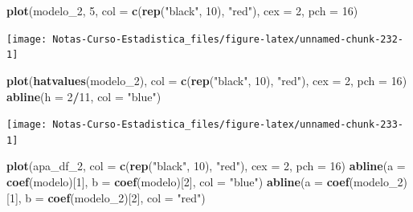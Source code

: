 \documentclass[
  12pt,
]{book}
\newenvironment{Shaded}{\begin{snugshade}}{\end{snugshade}}
\newcommand{\DataTypeTok}[1]{\textcolor[rgb]{0.13,0.29,0.53}{#1}}
\newcommand{\DecValTok}[1]{\textcolor[rgb]{0.00,0.00,0.81}{#1}}
\newcommand{\KeywordTok}[1]{\textcolor[rgb]{0.13,0.29,0.53}{\textbf{#1}}}
\newcommand{\NormalTok}[1]{#1}
\newcommand{\OperatorTok}[1]{\textcolor[rgb]{0.81,0.36,0.00}{\textbf{#1}}}
\newcommand{\StringTok}[1]{\textcolor[rgb]{0.31,0.60,0.02}{#1}}
\theoremstyle{definition}
\theoremstyle{definition}
\theoremstyle{definition}
\theoremstyle{remark}
\begin{document}
\begin{Shaded}
\begin{Highlighting}[]
\KeywordTok{plot}\NormalTok{(modelo_}\DecValTok{2}\NormalTok{, }\DecValTok{5}\NormalTok{, }\DataTypeTok{col =} \KeywordTok{c}\NormalTok{(}\KeywordTok{rep}\NormalTok{(}\StringTok{"black"}\NormalTok{, }\DecValTok{10}\NormalTok{), }\StringTok{"red"}\NormalTok{), }
    \DataTypeTok{cex =} \DecValTok{2}\NormalTok{, }\DataTypeTok{pch =} \DecValTok{16}\NormalTok{)}
\end{Highlighting}
\end{Shaded}

\begin{center}\texttt{[image: Notas-Curso-Estadistica\_files/figure-latex/unnamed-chunk-232-1]} \end{center}

\begin{Shaded}
\begin{Highlighting}[]
\KeywordTok{plot}\NormalTok{(}\KeywordTok{hatvalues}\NormalTok{(modelo_}\DecValTok{2}\NormalTok{), }\DataTypeTok{col =} \KeywordTok{c}\NormalTok{(}\KeywordTok{rep}\NormalTok{(}\StringTok{"black"}\NormalTok{, }\DecValTok{10}\NormalTok{), }
    \StringTok{"red"}\NormalTok{), }\DataTypeTok{cex =} \DecValTok{2}\NormalTok{, }\DataTypeTok{pch =} \DecValTok{16}\NormalTok{)}
\KeywordTok{abline}\NormalTok{(}\DataTypeTok{h =} \DecValTok{2}\OperatorTok{/}\DecValTok{11}\NormalTok{, }\DataTypeTok{col =} \StringTok{"blue"}\NormalTok{)}
\end{Highlighting}
\end{Shaded}

\begin{center}\texttt{[image: Notas-Curso-Estadistica\_files/figure-latex/unnamed-chunk-233-1]} \end{center}

\begin{Shaded}
\begin{Highlighting}[]
\KeywordTok{plot}\NormalTok{(apa_df_}\DecValTok{2}\NormalTok{, }\DataTypeTok{col =} \KeywordTok{c}\NormalTok{(}\KeywordTok{rep}\NormalTok{(}\StringTok{"black"}\NormalTok{, }\DecValTok{10}\NormalTok{), }\StringTok{"red"}\NormalTok{), }\DataTypeTok{cex =} \DecValTok{2}\NormalTok{, }
    \DataTypeTok{pch =} \DecValTok{16}\NormalTok{)}
\KeywordTok{abline}\NormalTok{(}\DataTypeTok{a =} \KeywordTok{coef}\NormalTok{(modelo)[}\DecValTok{1}\NormalTok{], }\DataTypeTok{b =} \KeywordTok{coef}\NormalTok{(modelo)[}\DecValTok{2}\NormalTok{], }\DataTypeTok{col =} \StringTok{"blue"}\NormalTok{)}
\KeywordTok{abline}\NormalTok{(}\DataTypeTok{a =} \KeywordTok{coef}\NormalTok{(modelo_}\DecValTok{2}\NormalTok{)[}\DecValTok{1}\NormalTok{], }\DataTypeTok{b =} \KeywordTok{coef}\NormalTok{(modelo_}\DecValTok{2}\NormalTok{)[}\DecValTok{2}\NormalTok{], }
    \DataTypeTok{col =} \StringTok{"red"}\NormalTok{)}
\end{Highlighting}
\end{Shaded}
\end{document}
